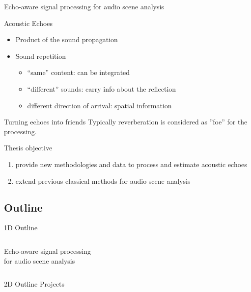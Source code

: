 \begin{frame}{\alert{Echo-aware} signal processing for audio scene analysis}

    \begin{mydefblock}{Acoustic Echoes}
        \begin{itemize}
            \item Product of the sound propagation
            \item Sound repetition
            \begin{itemize}
                \item ``same'' content: can be integrated
                \item ``different'' sounds: carry info about the reflection
                \item different direction of arrival: spatial information
            \end{itemize}
        \end{itemize}
    \end{mydefblock}

    \begin{block}{Turning echoes into friends}
        Typically reverberation is considered as ''foe'' for the processing.
    \end{block}

    \begin{mydefblock}{Thesis objective}
        \begin{enumerate}
        \item provide new methodologies and data to process and estimate acoustic echoes
            \item extend previous classical methods for audio scene analysis
        \end{enumerate}
    \end{mydefblock}
\end{frame}


\subsection{Outline}

\begin{frame}{1D Outline}
    \begin{columns}
        \begin{column}{0.3\textwidth}
            Echo-aware signal processing
            \\for audio scene analysis
        \end{column}
        \begin{column}{0.6\textwidth}
            \color{white}
            \tableofcontents
        \end{column}
    \end{columns}
\end{frame}

\begin{frame}{2D Outline}
    Projects
\end{frame}